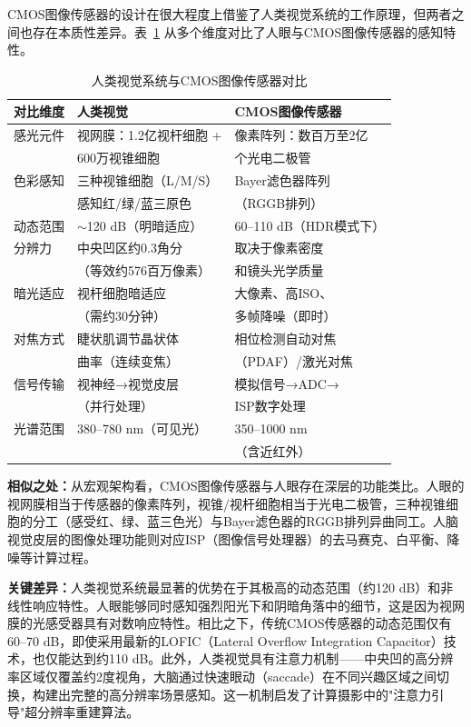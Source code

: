 \documentclass[12pt, a4paper]{ctexart}
\begin{document}
CMOS图像传感器的设计在很大程度上借鉴了人类视觉系统的工作原理，但两者之间也存在本质性差异。表~\ref{tab:human_vs_cmos} 从多个维度对比了人眼与CMOS图像传感器的感知特性。

\begin{table}[H]
\centering
\caption{人类视觉系统与CMOS图像传感器对比}
\label{tab:human_vs_cmos}
\small
\begin{tabular}{lll}
\toprule
\textbf{对比维度} & \textbf{人类视觉} & \textbf{CMOS图像传感器} \\
\midrule
感光元件 & 视网膜：1.2亿视杆细胞 + & 像素阵列：数百万至2亿 \\
 & 600万视锥细胞 & 个光电二极管 \\
\midrule
色彩感知 & 三种视锥细胞（L/M/S） & Bayer滤色器阵列 \\
 & 感知红/绿/蓝三原色 & （RGGB排列） \\
\midrule
动态范围 & $\sim$120 dB（明暗适应） & 60--110 dB（HDR模式下） \\
\midrule
分辨力 & 中央凹区约0.3角分 & 取决于像素密度 \\
 & （等效约576百万像素） & 和镜头光学质量 \\
\midrule
暗光适应 & 视杆细胞暗适应 & 大像素、高ISO、 \\
 & （需约30分钟） & 多帧降噪（即时） \\
\midrule
对焦方式 & 睫状肌调节晶状体 & 相位检测自动对焦 \\
 & 曲率（连续变焦） & （PDAF）/激光对焦 \\
\midrule
信号传输 & 视神经→视觉皮层 & 模拟信号→ADC→ \\
 & （并行处理） & ISP数字处理 \\
\midrule
光谱范围 & 380--780 nm（可见光） & 350--1000 nm \\
 & & （含近红外） \\
\bottomrule
\end{tabular}
\end{table}

\textbf{相似之处：}从宏观架构看，CMOS图像传感器与人眼存在深层的功能类比。人眼的视网膜相当于传感器的像素阵列，视锥/视杆细胞相当于光电二极管，三种视锥细胞的分工（感受红、绿、蓝三色光）与Bayer滤色器的RGGB排列异曲同工。人脑视觉皮层的图像处理功能则对应ISP（图像信号处理器）的去马赛克、白平衡、降噪等计算过程。

\textbf{关键差异：}人类视觉系统最显著的优势在于其极高的动态范围（约120 dB）和非线性响应特性。人眼能够同时感知强烈阳光下和阴暗角落中的细节，这是因为视网膜的光感受器具有对数响应特性。相比之下，传统CMOS传感器的动态范围仅有60--70 dB，即使采用最新的LOFIC（Lateral Overflow Integration Capacitor）技术，也仅能达到约110 dB\cite{adhocnews2025}。此外，人类视觉具有注意力机制——中央凹的高分辨率区域仅覆盖约2度视角，大脑通过快速眼动（saccade）在不同兴趣区域之间切换，构建出完整的高分辨率场景感知。这一机制启发了计算摄影中的"注意力引导"超分辨率重建算法。
\end{document}
